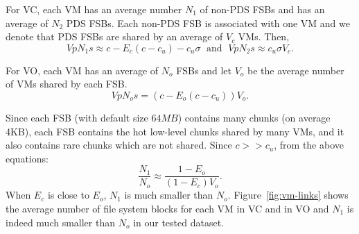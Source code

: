For VC, each VM has an average number $N_1$ of non-PDS FSBs
and  has  an average of  $N_2$ PDS FSBs. 
Each non-PDS FSB is associated with one VM
 and  we denote that PDS FSBs are
shared by an average of $V_c$ VMs. 
Then, 
\[
V pN_1 s  \approx c-E_c(c-c_u) - c_u\sigma\; \mbox{ and } \; 
V pN_2 s  \approx c_u \sigma V_c.
\]

For VO, each VM has an average of $N_o$ FSBs
and let $V_o$ be the average number of VMs shared by each FSB.
\[
V pN_o s  = (c- E_o(c-c_u) ) V_o.
\]

Since each FSB (with default size $64MB$) contains many chunks (on average 4KB),
each FSB contains the hot low-level chunks shared by many VMs, and it also contains
rare chunks which are not shared.  Since $c>> c_u$, from the above equations:
\[
\frac{N_1}{N_o} \approx  \frac{1-E_o}{(1-E_c) V_o}.
\] 
When $E_c$ is close to $E_o$,
$N_1$ is much smaller than $N_o$. 
Figure~\ref{fig:vm-links} shows the average number of file system blocks for each VM in VC and in VO
and  $N_1$ is indeed  much smaller than $N_o$ in our tested dataset.  



